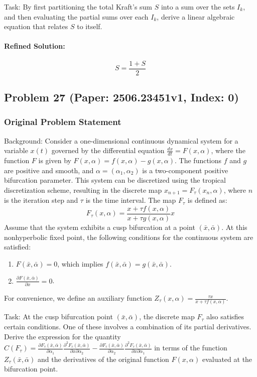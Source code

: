 \documentclass[10pt]{article}
\begin{document}
Task:
By first partitioning the total Kraft's sum $S$ into a sum over the sets $I_k$, and then evaluating the partial sums over each $I_k$, derive a linear algebraic equation that relates $S$ to itself.

\paragraph*{Refined Solution:}
\[ S = \frac{1+S}{2} \]

\newpage
\subsection*{Problem 27 (Paper: 2506.23451v1, Index: 0)}

\subsubsection*{Original Problem Statement}
Background:
Consider a one-dimensional continuous dynamical system for a variable $x(t)$ governed by the differential equation $\frac{dx}{dt} = F(x, \alpha)$, where the function $F$ is given by $F(x, \alpha) = f(x, \alpha) - g(x, \alpha)$. The functions $f$ and $g$ are positive and smooth, and $\alpha = (\alpha_1, \alpha_2)$ is a two-component positive bifurcation parameter. This system can be discretized using the tropical discretization scheme, resulting in the discrete map $x_{n+1} = F_\tau(x_n, \alpha)$, where $n$ is the iteration step and $\tau$ is the time interval. The map $F_\tau$ is defined as:
\begin{equation*}
    F_\tau(x, \alpha) = \frac{x+\tau f(x,\alpha)}{x+\tau g(x,\alpha)} x
\end{equation*}
Assume that the system exhibits a cusp bifurcation at a point $(\bar{x}, \bar{\alpha})$. At this nonhyperbolic fixed point, the following conditions for the continuous system are satisfied:
\begin{enumerate}
    \item $F(\bar{x}, \bar{\alpha}) = 0$, which implies $f(\bar{x}, \bar{\alpha}) = g(\bar{x}, \bar{\alpha})$.
    \item $\displaystyle\frac{\partial F(\bar{x}, \bar{\alpha})}{\partial x} = 0$.
\end{enumerate}
For convenience, we define an auxiliary function $Z_\tau(x, \alpha) = \frac{\tau x}{x + \tau f(x, \alpha)}$.

Task:
At the cusp bifurcation point $(\bar{x}, \bar{\alpha})$, the discrete map $F_\tau$ also satisfies certain conditions. One of these involves a combination of its partial derivatives. Derive the expression for the quantity $C(F_\tau) = \displaystyle\frac{\partial F_{\tau}(\bar x, \bar \alpha)}{\partial \alpha_1}\displaystyle\frac{\partial^2 F_{\tau}(\bar x, \bar \alpha)}{\partial x\partial \alpha_2}-\displaystyle\frac{\partial F_{\tau}(\bar x, \bar \alpha)}{\partial \alpha _2}\displaystyle\frac{\partial^2 F_{\tau}(\bar x, \bar \alpha)}{\partial x\partial \alpha_1}$ in terms of the function $Z_\tau(\bar{x}, \bar{\alpha})$ and the derivatives of the original function $F(x, \alpha)$ evaluated at the bifurcation point.
\end{document}
